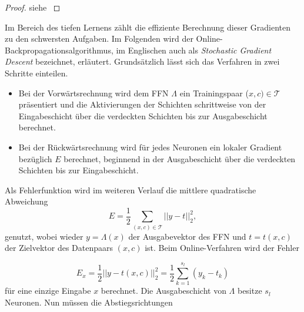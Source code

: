 \begin{proof}
    siehe \cite{forster2017analysis}
\end{proof}
Im Bereich des tiefen Lernens zählt die effiziente Berechnung dieser Gradienten zu den schwersten Aufgaben\cite{DBLP:series/lncs/LeCunBOM12}.
Im Folgenden wird der Online-Backpropagationsalgorithmus, im Englischen auch als \textit{Stochastic Gradient Descent} bezeichnet, erläutert. Grundsätzlich lässt sich das Verfahren in zwei Schritte einteilen.

\begin{itemize}
    \item Bei der Vorwärtsrechnung wird dem FFN $\Lambda$ ein Trainingspaar ($x,c) \in \mathcal{T}$ präsentiert und die Aktivierungen der Schichten schrittweise von der Eingabeschicht über die verdeckten Schichten bis zur Ausgabeschicht berechnet.
    \item Bei der Rückwärtsrechnung wird für jedes Neuronen ein lokaler Gradient bezüglich $E$ berechnet, beginnend in der Ausgabeschicht über die verdeckten Schichten bis zur Eingabeschicht.
\end{itemize}
Als Fehlerfunktion wird im weiteren Verlauf die mittlere quadratische Abweichung 
\begin{equation}
    \label{eq:MSE}
    E=\frac{1}{2} \sum_{(x,c) \in \mathcal{T}} ||y-t||_2^2,
\end{equation}
genutzt, wobei wieder $y=\Lambda(x)$ der Ausgabevektor des FFN und $t=t(x,c)$ der Zielvektor des Datenpaars $(x,c)$ ist. Beim Online-Verfahren wird der Fehler 

\begin{equation}
    \label{eq:MSE_single}
    E_x= \frac{1}{2} ||y-t(x,c)||_2^2= \frac{1}{2} \sum_{k=1}^{s_l} (y_k-t_k)
\end{equation}
für eine einzige Eingabe $x$ berechnet. Die Ausgabeschicht von $\Lambda$ besitze $s_l$ Neuronen. Nun müssen die Abstiegsrichtungen 

